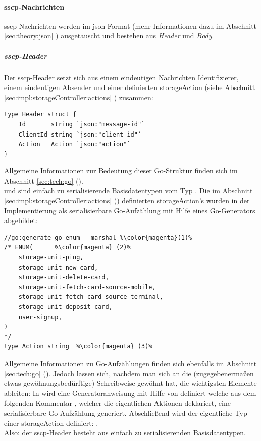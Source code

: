 \paragraph{\acrshort{sscp}-Nachrichten}
\acrshort{sscp}-Nachrichten werden im \acrshort{json}-Format (mehr Informationen dazu im Abschnitt \ref{sec:theory:json} ) ausgetauscht und bestehen aus \textit{Header} und \textit{Body}. 
\subparagraph{\acrshort{sscp}-Header}
Der \acrshort{sscp}-Header setzt sich aus einem eindeutigen Nachrichten Identifizierer, einem eindeutigen Absender und einer definierten \gls{storageAction} (siehe Abschnitt \ref{sec:impl:storageController:actions} ) zusammen:
\begin{lstlisting}[style=goMono,caption={SSCP Header}]
type Header struct {
    Id       string `json:"message-id"`
    ClientId string `json:"client-id"`
    Action   Action `json:"action"`
}
\end{lstlisting}
Allgemeine Informationen zur Bedeutung dieser Go-Struktur finden sich im Abschnitt \ref{sec:tech:go} ().\\
 und  sind einfach zu serialisierende Basisdatentypen vom Typ . Die im Abschnitt \ref{sec:impl:storageController:actions} () definierten \gls{storageAction}'s wurden in der Implementierung als serialisierbare Go-Aufzählung mit Hilfe eines Go-Generators abgebildet:
\begin{lstlisting}[style=goMono,caption={SSCP Header Objekt}]
//go:generate go-enum --marshal %\color{magenta}(1)%
/* ENUM(      %\color{magenta} (2)%
    storage-unit-ping,
    storage-unit-new-card,
    storage-unit-delete-card,
    storage-unit-fetch-card-source-mobile,
    storage-unit-fetch-card-source-terminal,
    storage-unit-deposit-card,
    user-signup,
)
*/
type Action string  %\color{magenta} (3)%
\end{lstlisting}
Allgemeine Informationen zu Go-Aufzählungen finden sich ebenfalls im Abschnitt \ref{sec:tech:go} (). Jedoch lassen sich, nachdem man sich an die (zugegebenermaßen etwas gewöhnungsbedürftige) Schreibweise gewöhnt hat, die wichtigsten Elemente ableiten: In  wird eine Generatoranweisung mit Hilfe von \frqq{}\flqq{} definiert welche aus dem folgenden Kommentar , welcher die eigentlichen Aktionen deklariert, eine serialisierbare Go-Aufzählung generiert. Abschließend  wird der eigentliche Typ einer \gls{storageAction} definiert: .\\
Also: der \acrshort{sscp}-Header besteht aus einfach zu serialisierenden Basisdatentypen.\bigskip

